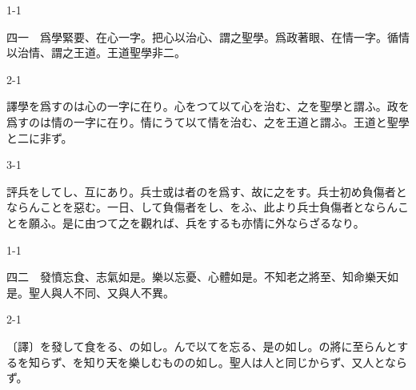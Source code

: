 \documentclass[tate,paper=b6j,jafontsize=9pt]{jlreq}
\begin{document}
\begin{azconvIndented}{1\zw}{-1\zw}

四一　爲學緊要、在心一字。把心以治心、謂之聖學。爲政著眼、在情一字。循情以治情、謂之王道。王道聖學非二。

\end{azconvIndented}
\begin{azconvIndented}{2\zw}{-1\zw}

譯學を爲すのは心の一字に在り。心をつて以て心を治む、之を聖學と謂ふ。政を爲すのは情の一字に在り。情にうて以て情を治む、之を王道と謂ふ。王道と聖學と二に非ず。

\end{azconvIndented}
\begin{azconvIndented}{3\zw}{-1\zw}

評兵をしてし、互にあり。兵士或は者のを爲す、故に之をす。兵士初め負傷者とならんことを惡む。一日、して負傷者をし、をふ、此より兵士負傷者とならんことを願ふ。是に由つて之を觀れば、兵をするも亦情に外ならざるなり。

\end{azconvIndented}

\begin{azconvIndented}{1\zw}{-1\zw}

四二　發憤忘食、志氣如是。樂以忘憂、心體如是。不知老之將\azconvKunten{\azconvIR}至、知命樂天如是。聖人與人不同、又與人不異。

\end{azconvIndented}
\begin{azconvIndented}{2\zw}{-1\zw}

〔譯〕を發して食をる、の如し。んで以てを忘る、是の如し。の將に至らんとするを知らず、を知り天を樂しむものの如し。聖人は人と同じからず、又人とならず。

\end{azconvIndented}
\end{document}
